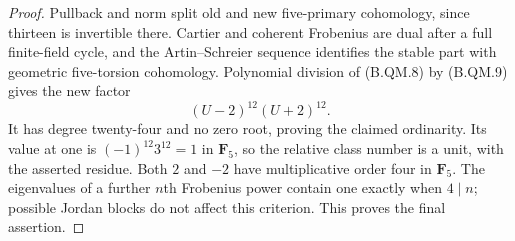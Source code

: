 \begin{proof}
Pullback and norm split old and new five-primary cohomology,
since thirteen is invertible there. Cartier and coherent
Frobenius are dual after a full finite-field cycle, and the
Artin--Schreier sequence identifies the stable part with
geometric five-torsion cohomology. Polynomial division of
(B.QM.8) by (B.QM.9) gives the new factor
\[
                  (U-2)^{12}(U+2)^{12}.                        \tag{B.QM.10}
\]
It has degree twenty-four and no zero root, proving the
claimed ordinarity. Its value at one is
$(-1)^{12}3^{12}=1$ in $\mathbf F_5$, so the relative
class number is a unit, with the asserted residue.
Both $2$ and $-2$ have multiplicative order four in
$\mathbf F_5$. The eigenvalues of a further $n$th Frobenius
power contain one exactly when $4\mid n$; possible Jordan
blocks do not affect this criterion. This proves the final
assertion.
\end{proof}

